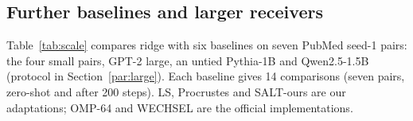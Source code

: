 \documentclass[preprint,12pt]{elsarticle}
\begin{document}
\subsection{Further baselines and larger receivers}
\label{sec:scale}
Table~\ref{tab:scale} compares ridge with six baselines on seven PubMed seed-1 pairs: the four small pairs, GPT-2 large, an untied Pythia-1B and Qwen2.5-1.5B (protocol in Section~\ref{par:large}). Each baseline gives 14 comparisons (seven pairs, zero-shot and after 200 steps). LS, Procrustes and SALT-ours are our adaptations; OMP-64 and WECHSEL are the official implementations.
\begin{table}[t]
\centering\scriptsize
\caption{Ridge minus each baseline, mean NLL difference per sentence in nats (negative = ridge better); $^{*}$ = 95\,\% paired bootstrap interval excludes 0. OMP-64c cal.\ = official OMP-64 on centred inputs with the same calibrated length as ridge; OMP-64s = OMP-64 as shipped; LS, Procrustes and SALT-ours are our adaptations (calibrated length); WECHSEL = official, calibrated length. Unch.\ = ridge minus the unchanged receiver (word left split; positive = ridge worse). Ridge is the variant chosen by the training objective. Intervals are in Tables~\ref{tab:scaleci1} and \ref{tab:scaleci2}, bits per byte in Table~\ref{tab:bpb}.}
\label{tab:scale}
\resizebox{\textwidth}{!}{}
\end{table}
\end{document}
